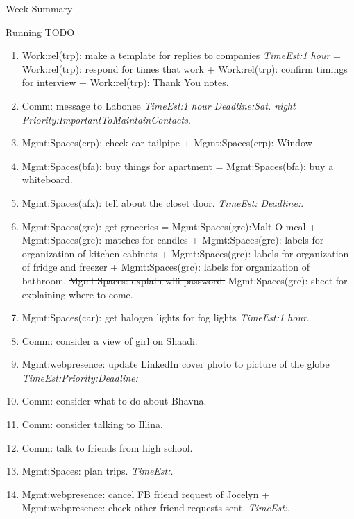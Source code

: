 \documentclass[serif, mathserif, final]{beamer}
\newcommand{\doneTaskNoItem}[1]{\sout{#1}}
\newcommand{\te}[1]{\textit{TimeEst:}\textit{#1}}
\newcommand{\dl}[1]{\textit{Deadline:}\textit{#1}}
\newcommand{\pr}[1]{\textit{Priority:}\textit{#1}}
\begin{document}
\begin{frame}
\begin{columns}
\begin{column}{0.5\linewidth}
\begin{block}{Week Summary}
\begin{block}{Running TODO}
\begin{enumerate}
      \item \tiny Work:rel(trp): make a template for replies to
        companies \te{1 hour} = Work:rel(trp): respond for times that
        work + Work:rel(trp): confirm timings for interview +
        Work:rel(trp): Thank You notes. 

      \item \tiny Comm: message to Labonee \te{1 hour} \dl{Sat. night}
        \pr{ImportantToMaintainContacts}.
        
      \item \tiny Mgmt:Spaces(crp): check car tailpipe +
        Mgmt:Spaces(crp): Window 

      \item \tiny Mgmt:Spaces(bfa): buy things for apartment =
        Mgmt:Spaces(bfa): buy a whiteboard. 

      \item \tiny Mgmt:Spaces(afx): tell about the closet door. \te{}
        \dl{}. 

        
      \item \tiny Mgmt:Spaces(grc): get groceries =
        Mgmt:Spaces(grc):Malt-O-meal + Mgmt:Spaces(grc): matches for
        candles + Mgmt:Spaces(grc): labels for organization of kitchen
        cabinets + Mgmt:Spaces(grc): labels for organization of fridge and freezer +
        Mgmt:Spaces(grc): labels for organization of bathroom. 
        \doneTaskNoItem{Mgmt:Spaces: explain wifi password.} 
        Mgmt:Spaces(grc): sheet for explaining where to come. 

      \item \tiny  Mgmt:Spaces(car): get halogen lights for fog lights
        \te{1 hour}. 
          
      \item \tiny Comm: consider a view of girl on Shaadi. 

      \item \tiny Mgmt:webpresence: update LinkedIn cover photo to picture
        of the globe \te{}\pr{}\dl{} 

      \item \tiny Comm: consider what to do about Bhavna. 
      \item \tiny Comm: consider talking to Illina. 
      \item \tiny Comm: talk to friends from high school.
      \item \tiny Mgmt:Spaces: plan trips. \te{}. 

      \item \tiny Mgmt:webpresence: cancel FB friend request of
        Jocelyn + Mgmt:webpresence: check other friend requests
        sent. \te{}. 


\end{enumerate}
\end{block}
\end{block}
\end{column}
\end{columns}
\end{frame}
\end{document}
